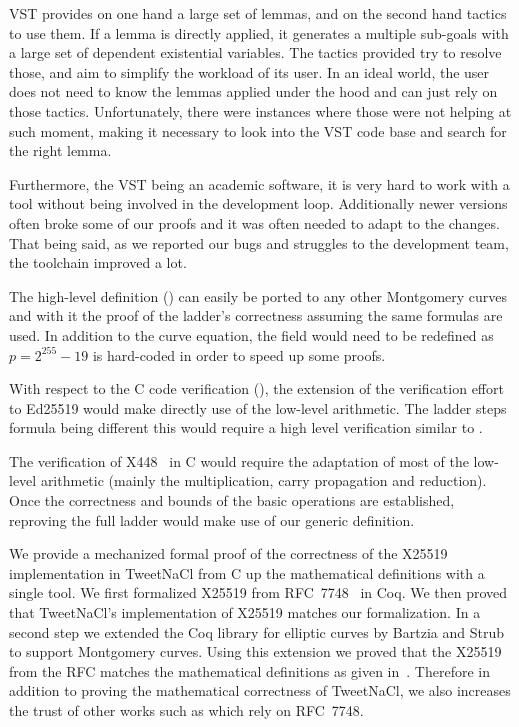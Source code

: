 VST provides on one hand a large set of lemmas, and on the second hand tactics to use them.
If a lemma is directly applied, it generates a multiple sub-goals with a large set of dependent existential variables.
The tactics provided try to resolve those, and aim to simplify the workload of its user.
In an ideal world, the user does not need to know the lemmas applied under the hood and can just rely on those tactics.
Unfortunately, there were instances where those were not helping
at such moment, making it necessary to look into the VST code base and search for the right lemma.

Furthermore, the VST being an academic software, it is very hard to work with a tool
without being involved in the development loop. Additionally newer versions often broke
some of our proofs and it was often needed to adapt to the changes. That being said,
as we reported our bugs and struggles to the development team, the toolchain improved a lot.

The high-level definition () can easily be ported to any
other Montgomery curves and with it the proof of the ladder's correctness
assuming the same formulas are used.
In addition to the curve equation, the field  would need to be redefined
as $p=2^{255}-19$ is hard-coded in order to speed up some proofs.

With respect to the C code verification (), the extension of
the verification effort to Ed25519 would make directly use of the low-level
arithmetic. The ladder steps formula being different this would require a high
level verification similar to .

The verification of \eg X448~\cite{cryptoeprint:2015:625,rfc7748} in C would
require the adaptation of most of the low-level arithmetic (mainly the
multiplication, carry propagation and reduction).
Once the correctness and bounds of the basic operations are established,
reproving the full ladder would make use of our generic definition.

We provide a mechanized formal proof of the correctness of the X25519
implementation in TweetNaCl from C up the mathematical definitions with a single tool.
We first formalized X25519 from RFC~7748~\cite{rfc7748} in Coq.
We then proved that TweetNaCl's implementation of X25519 matches our formalization.
In a second step we extended the Coq library for elliptic curves \cite{BartziaS14}
by Bartzia and Strub to support Montgomery curves.
Using this extension we proved that the X25519 from the RFC matches the
mathematical definitions as given in~\cite[Sec.~2]{Ber06}.
Therefore in addition to proving the mathematical correctness of TweetNaCl,
we also increases the trust of other works such as
\cite{zinzindohoue2017hacl,Erbsen2016SystematicSO} which rely on RFC~7748.
